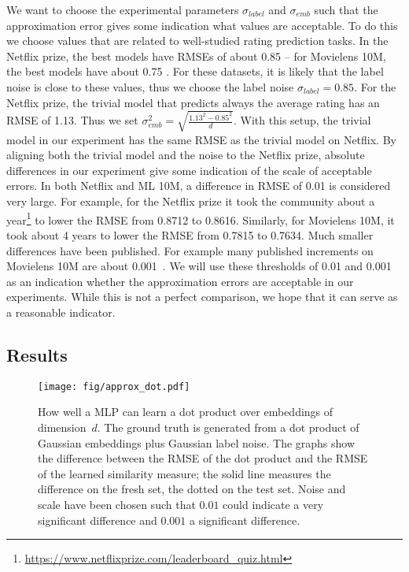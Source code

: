 \documentclass{article}
\begin{document}
We want to choose the experimental parameters $\sigma_{label}$ and $\sigma_{emb}$ such that the approximation error gives some indication what values are acceptable.
To do this we choose values that are related to well-studied rating prediction tasks.
In the Netflix prize, the best models have RMSEs of about 0.85 \cite{koren:grandprize} -- for Movielens 10M, the best models have about 0.75 \cite{rendle:arxiv19}.
For these datasets, it is likely that the label noise is close to these values, thus we choose the label noise $\sigma_{label} = 0.85$.
For the Netflix prize, the trivial model that predicts always the average rating has an RMSE of 1.13.
Thus we set $\sigma_{emb}^2 = \sqrt{\frac{1.13^2 - 0.85^2}{d}}$.
With this setup, the trivial model in our experiment has the same RMSE as the trivial model on Netflix.
By aligning both the trivial model and the noise to the Netflix prize, absolute differences in our experiment give some indication of the scale of acceptable errors.
In both Netflix and ML 10M, a difference in RMSE of 0.01 is considered very large.
For example, for the Netflix prize it took the community about a year\footnote{\url{https://www.netflixprize.com/leaderboard_quiz.html}} to lower the RMSE from 0.8712 to 0.8616.
Similarly, for Movielens 10M, it took about 4 years  to lower the RMSE from 0.7815 to 0.7634.
Much smaller differences have been published. For example many published increments on Movielens 10M are about 0.001~\cite{rendle:arxiv19}.
We will use these thresholds of 0.01 and 0.001 as an indication whether the approximation errors are acceptable in our experiments.
While this is not a perfect comparison, we hope that it can serve as a reasonable indicator.

\subsection{Results}

\begin{figure}
    \centering
    \texttt{[image: fig/approx\_dot.pdf]}
    \caption{How well a MLP can learn a dot product over embeddings of dimension~$d$.
    The ground truth is generated from a dot product of Gaussian embeddings plus Gaussian label noise.
    The graphs show the difference between the RMSE of the dot product and the RMSE of the learned similarity measure; the solid line measures the difference on the fresh set, the dotted on the test set.
    Noise and scale have been chosen such that $0.01$ could indicate a very significant difference and $0.001$ a significant difference.}
    \label{fig:approx_dot}
\end{figure}
\end{document}
